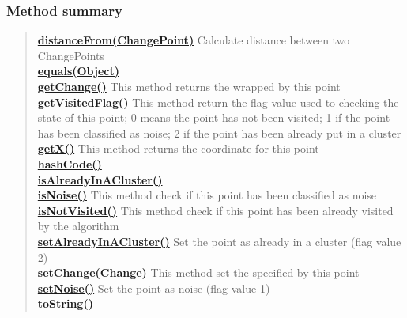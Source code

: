 {{{{{\subsubsection{Method summary}{
\begin{verse}
\hyperlink{it.unisa.sesa.repominer.dbscan.ChangePoint.distanceFrom(it.unisa.sesa.repominer.dbscan.ChangePoint)}{{\bf distanceFrom(ChangePoint)}} Calculate distance between two ChangePoints\\
\hyperlink{it.unisa.sesa.repominer.dbscan.ChangePoint.equals(java.lang.Object)}{{\bf equals(Object)}} \\
\hyperlink{it.unisa.sesa.repominer.dbscan.ChangePoint.getChange()}{{\bf getChange()}} This method returns the \hyperlink{it.unisa.sesa.repominer.db.entities.Change}{}{\small 
{}} wrapped by this point\\
\hyperlink{it.unisa.sesa.repominer.dbscan.ChangePoint.getVisitedFlag()}{{\bf getVisitedFlag()}} This method return the flag value used to checking the state of this point; 0 means the point has not been visited; 1 if the point has been classified as noise; 2 if the point has been already put in a cluster\\
\hyperlink{it.unisa.sesa.repominer.dbscan.ChangePoint.getX()}{{\bf getX()}} This method returns the coordinate for this point\\
\hyperlink{it.unisa.sesa.repominer.dbscan.ChangePoint.hashCode()}{{\bf hashCode()}} \\
\hyperlink{it.unisa.sesa.repominer.dbscan.ChangePoint.isAlreadyInACluster()}{{\bf isAlreadyInACluster()}} \\
\hyperlink{it.unisa.sesa.repominer.dbscan.ChangePoint.isNoise()}{{\bf isNoise()}} This method check if this point has been classified as noise\\
\hyperlink{it.unisa.sesa.repominer.dbscan.ChangePoint.isNotVisited()}{{\bf isNotVisited()}} This method check if this point has been already visited by the algorithm\\
\hyperlink{it.unisa.sesa.repominer.dbscan.ChangePoint.setAlreadyInACluster()}{{\bf setAlreadyInACluster()}} Set the point as already in a cluster (flag value 2)\\
\hyperlink{it.unisa.sesa.repominer.dbscan.ChangePoint.setChange(it.unisa.sesa.repominer.db.entities.Change)}{{\bf setChange(Change)}} This method set the \hyperlink{it.unisa.sesa.repominer.db.entities.Change}{}{\small 
{}} specified by this point\\
\hyperlink{it.unisa.sesa.repominer.dbscan.ChangePoint.setNoise()}{{\bf setNoise()}} Set the point as noise (flag value 1)\\
\hyperlink{it.unisa.sesa.repominer.dbscan.ChangePoint.toString()}{{\bf toString()}} \\
\end{verse}
}
}}}}}
